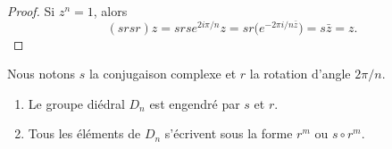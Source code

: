 \begin{proof}
    Si \( z^n=1\), alors
    \begin{equation}
        (srsr)z=srs e^{2 i\pi/n}z=sr\big( e^{-2\pi i/n\bar z}\big)=s\bar z=z.
    \end{equation}
\end{proof}

\begin{proposition} \label{PropLDIPoZ}
    Nous notons \( s\) la conjugaison complexe et \( r\) la rotation d'angle \( 2\pi/n\).
    \begin{enumerate}
        \item
            Le groupe diédral \( D_n\) est engendré par \( s\) et \( r\). 
        \item       \label{ITEMooOEBHooULRmZk}
            Tous les éléments de \( D_n\) s'écrivent sous la forme \( r^m\) ou \( s\circ r^m\).
    \end{enumerate}
\end{proposition}


